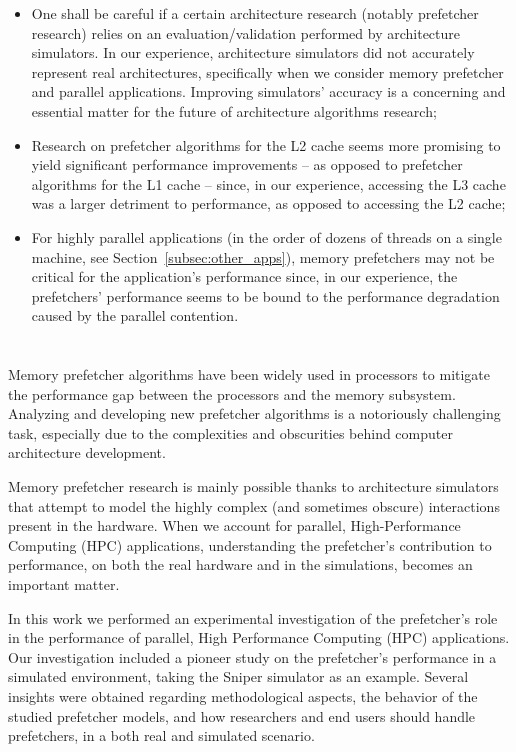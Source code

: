 \documentclass[AMA,final,STIX1COL]{WileyNJD-v2}
\newcommand\new[1]{{\color{red}{#1}}}
\begin{document}
{\begin{itemize}
    \item One shall be careful if a certain architecture research (notably prefetcher research) relies on an evaluation/validation performed by architecture simulators. In our experience, architecture simulators did not accurately represent real architectures, specifically when we consider memory prefetcher and parallel applications. Improving simulators' accuracy is a concerning and essential matter for the future of architecture algorithms research;
    
    \item Research on prefetcher algorithms for the L2 cache seems more promising to yield significant performance improvements -- as opposed to prefetcher algorithms for the L1 cache -- since, in our experience, accessing the L3 cache was a larger detriment to performance, as opposed to accessing the L2 cache;
    
    \item For highly parallel applications (in the order of dozens of threads on a single machine, see Section~\ref{subsec:other_apps}), memory prefetchers may not be critical for the application's performance since, in our experience, the prefetchers' performance seems to be bound to the performance degradation caused by the parallel contention.
\end{itemize}

\section{\new{Conclusion and Future Work}}\label{sec:conclusion}

Memory prefetcher algorithms have been widely used in processors to mitigate the performance gap between the processors and the memory subsystem. Analyzing and developing new prefetcher algorithms is a notoriously challenging task, especially due to the complexities and obscurities behind computer architecture development.

Memory prefetcher research is mainly possible thanks to architecture simulators that attempt to model the highly complex (and sometimes obscure) interactions present in the hardware. When we account for parallel, High-Performance Computing (HPC) applications, understanding the prefetcher's contribution to performance, on both the real hardware and in the simulations, becomes an important matter. 

In this work we performed an experimental investigation of the prefetcher's role in the performance of parallel, High Performance Computing (HPC) applications. Our investigation included a pioneer study on the prefetcher's performance in a simulated environment, taking the Sniper simulator as an example. Several insights were obtained regarding methodological aspects, the behavior of the studied prefetcher models, and how researchers and end users should handle prefetchers, in a both real and simulated scenario. 


}
\end{document}
